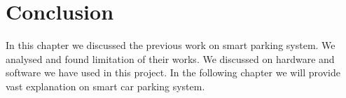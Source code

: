 \section{Conclusion}
In this chapter we discussed the previous work on smart parking system. We analysed and found limitation of their works. We discussed on hardware and software we have used in this project. In the following chapter we will provide vast explanation on smart car parking system.